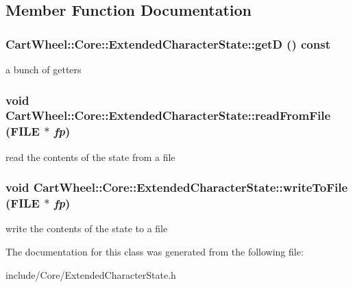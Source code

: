 \subsection{Member Function Documentation}
\hypertarget{classCartWheel_1_1Core_1_1ExtendedCharacterState_ac389585b887f42c16427489f8c26644d}{
\subsubsection[{getD}]{ CartWheel::Core::ExtendedCharacterState::getD () const}}
\label{classCartWheel_1_1Core_1_1ExtendedCharacterState_ac389585b887f42c16427489f8c26644d}
a bunch of getters \hypertarget{classCartWheel_1_1Core_1_1ExtendedCharacterState_a7a489a53e814aeaca4309ab1d5ae108b}{
\subsubsection[{readFromFile}]{\setlength{\rightskip}{0pt plus 5cm}void CartWheel::Core::ExtendedCharacterState::readFromFile (FILE $\ast$ {\em fp})}}
\label{classCartWheel_1_1Core_1_1ExtendedCharacterState_a7a489a53e814aeaca4309ab1d5ae108b}
read the contents of the state from a file \hypertarget{classCartWheel_1_1Core_1_1ExtendedCharacterState_a82277255cfb173c32ca71924bd4ad182}{
\subsubsection[{writeToFile}]{\setlength{\rightskip}{0pt plus 5cm}void CartWheel::Core::ExtendedCharacterState::writeToFile (FILE $\ast$ {\em fp})}}
\label{classCartWheel_1_1Core_1_1ExtendedCharacterState_a82277255cfb173c32ca71924bd4ad182}
write the contents of the state to a file 

The documentation for this class was generated from the following file:\begin{DoxyCompactItemize}
\item 
include/Core/ExtendedCharacterState.h\end{DoxyCompactItemize}
